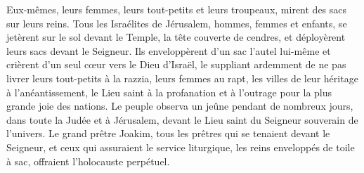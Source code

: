 Eux-mêmes, leurs femmes, leurs tout-petits et leurs troupeaux,
	mirent des sacs sur leurs reins.
Tous les Israélites de Jérusalem, hommes, femmes et enfants,
	se jetèrent sur le sol devant le Temple, la tête couverte de cendres,
	et déployèrent leurs sacs devant le Seigneur.
Ils enveloppèrent d’un sac l’autel lui-même
	et crièrent d’un seul cœur vers le Dieu d’Israël,
	le suppliant ardemment de ne pas livrer leurs tout-petits à la razzia,
	leurs femmes au rapt, les villes de leur héritage à l’anéantissement,
	le Lieu saint à la profanation et à l’outrage pour la plus grande joie des nations.
Le peuple observa un jeûne pendant de nombreux jours, dans toute la Judée et à Jérusalem,
	devant le Lieu saint du Seigneur souverain de l’univers.
Le grand prêtre Joakim, tous les prêtres qui se tenaient devant le Seigneur,
		et ceux qui assuraient le service liturgique,
	les reins enveloppés de toile à sac, offraient l’holocauste perpétuel.
